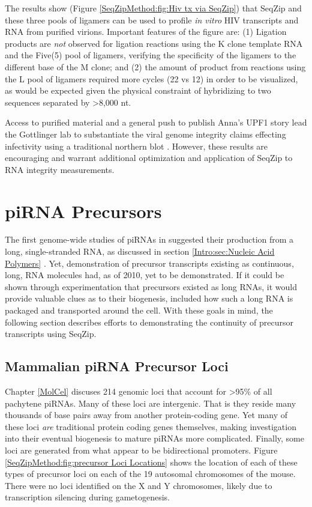     The results show (Figure \ref{SeqZipMethod:fig:Hiv tx via SeqZip}) that SeqZip and these three pools of ligamers can be used to profile \textit{in vitro} HIV transcripts and RNA from purified virions. Important features of the figure are: (1) Ligation products are \textit{not} observed for ligation reactions using the K clone template RNA and the Five(5) pool of ligamers, verifying the specificity of the ligamers to the different base of the M clone; and (2) the amount of product from reactions using the L pool of ligamers required more cycles (22 vs 12) in order to be visualized, as would be expected given the physical constraint of hybridizing to two sequences separated by >8,000 nt. 

    Access to purified material and a general push to publish Anna's UPF1 story lead the Gottlinger lab to substantiate the viral genome integrity claims effecting infectivity using a traditional northern blot \citep{Serquina2013}. However, these results are encouraging and warrant additional optimization and application of SeqZip to RNA integrity measurements.

\section{piRNA Precursors}
  \label{SeqZipMethod:sec:Demonstrating continuous precursor TX by SeqZip}

  The first genome-wide studies of piRNAs in \flies{} suggested their production from a long, single-stranded RNA, as discussed in section \ref{Intro:sec:Nucleic Acid Polymers} \citep{Brennecke2007,Gunawardane2007}. Yet, demonstration of precursor transcripts existing as continuous, long, RNA molecules had, as of 2010, yet to be demonstrated. If it could be shown through experimentation that precursors existed as long RNAs, it would provide valuable clues as to their biogenesis, included how such a long RNA is packaged and transported around the cell. With these goals in mind, the following section describes efforts to demonstrating the continuity of precursor transcripts using SeqZip.

  \subsection{Mammalian piRNA Precursor Loci}
    \label{SeqZipMethod:subsec:Mammalian Loci of precursor Tx}

    Chapter \ref{MolCel} discuses 214 genomic loci that account for >95\% of all pachytene piRNAs. Many of these loci are intergenic. That is they reside many thousands of base pairs away from another protein-coding gene. Yet many of these loci \textit{are} traditional protein coding genes themselves, making investigation into their eventual biogenesis to mature piRNAs more complicated. Finally, some loci are generated from what appear to be bidirectional promoters. Figure \ref{SeqZipMethod:fig:precursor Loci Locations} shows the location of each of these types of precursor loci on each of the 19 autosomal chromosomes of the mouse. There were no loci identified on the X and Y chromosomes, likely due to transcription silencing during gametogenesis. 

